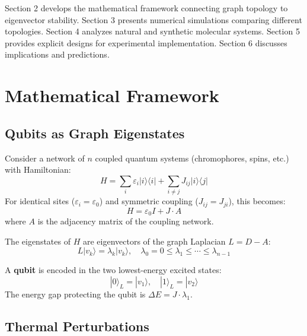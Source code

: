 \documentclass[11pt,a4paper]{article}
\theoremstyle{plain}
\theoremstyle{definition}
\theoremstyle{remark}
\begin{document}
Section 2 develops the mathematical framework connecting graph topology to eigenvector stability. Section 3 presents numerical simulations comparing different topologies. Section 4 analyzes natural and synthetic molecular systems. Section 5 provides explicit designs for experimental implementation. Section 6 discusses implications and predictions.

\section{Mathematical Framework}

\subsection{Qubits as Graph Eigenstates}

Consider a network of $n$ coupled quantum systems (chromophores, spins, etc.) with Hamiltonian:
\begin{equation}
H = \sum_{i} \varepsilon_i |i\rangle\langle i| + \sum_{i \neq j} J_{ij} |i\rangle\langle j|
\end{equation}
For identical sites ($\varepsilon_i = \varepsilon_0$) and symmetric coupling ($J_{ij} = J_{ji}$), this becomes:
\begin{equation}
H = \varepsilon_0 I + J \cdot A
\end{equation}
where $A$ is the adjacency matrix of the coupling network.

The eigenstates of $H$ are eigenvectors of the graph Laplacian $L = D - A$:
\begin{equation}
L |v_k\rangle = \lambda_k |v_k\rangle, \quad \lambda_0 = 0 \leq \lambda_1 \leq \cdots \leq \lambda_{n-1}
\end{equation}

A \textbf{qubit} is encoded in the two lowest-energy excited states:
\begin{equation}
|0\rangle_L = |v_1\rangle, \quad |1\rangle_L = |v_2\rangle
\end{equation}
The energy gap protecting the qubit is $\Delta E = J \cdot \lambda_1$.

\subsection{Thermal Perturbations}
\end{document}
